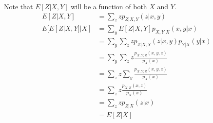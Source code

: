 \documentclass[../../probability-notes.tex]{subfiles}
\begin{document}
        Note that $E[Z|X,Y]$ will be a function of both $X$ and $Y$.
        \begin{align*}
            E[Z|X,Y] &= \sum_{z} z p_{Z|X,Y}(z|x,y)\\
            E[E[Z|X,Y]|X] &= \sum_{y} E[Z|X,Y]p_{X,Y|X}(x,y|x)\\
                        &= \sum_{y} \sum_{z} z p_{Z|X,Y}(z|x,y) p_{Y|X}(y|x)\\
                        &= \sum_{y} \sum_{z} z \frac{p_{X,Y,Z}(x,y,z)}{p_{X}(x)}\\
                        &= \sum_{z} z \sum_{y} \frac{p_{X,Y,Z}(x,y,z)}{p_{X}(x)}\\
                        &= \sum_{z} z \frac{p_{X,Z}(x,z)}{p_{X}(x)}\\
                        &= \sum_{z} z p_{Z|X}(z|x)\\
                        &= E[Z|X]
        \end{align*}
\end{document}
